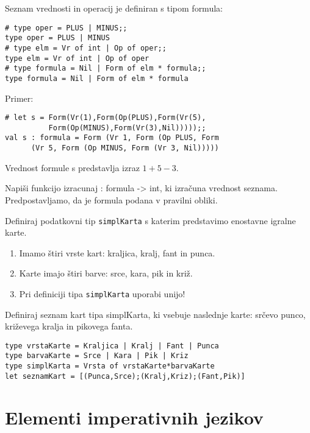 \begin{ex}
Seznam vrednosti in operacij je definiran s tipom formula: 

\begin{verbatim}
# type oper = PLUS | MINUS;; 
type oper = PLUS | MINUS 
# type elm = Vr of int | Op of oper;; 
type elm = Vr of int | Op of oper 
# type formula = Nil | Form of elm * formula;; 
type formula = Nil | Form of elm * formula 
\end{verbatim}

Primer: 
\begin{verbatim}
# let s = Form(Vr(1),Form(Op(PLUS),Form(Vr(5),
          Form(Op(MINUS),Form(Vr(3),Nil)))));;
val s : formula = Form (Vr 1, Form (Op PLUS, Form 
      (Vr 5, Form (Op MINUS, Form (Vr 3, Nil))))) 
\end{verbatim}
Vrednost formule s predstavlja izraz $1+5-3$. 

Napi\v si funkcijo izracunaj : formula -> int, ki izra\v cuna vrednost seznama. Predpostavljamo, da je formula podana v pravilni obliki.



\end{ex}
\begin{ex}
Definiraj podatkovni tip \texttt{simplKarta} s katerim predstavimo enostavne igralne karte. 
\begin{enumerate}
\item Imamo \v stiri vrste kart: kraljica, kralj, fant in punca. 
\item Karte imajo \v stiri barve: srce, kara, pik in kri\v z. 
\item Pri definiciji tipa \texttt{simplKarta} uporabi unijo!
\end{enumerate}

Definiraj seznam kart tipa simplKarta, ki vsebuje naslednje karte: sr\v cevo punco, kri\v zevega kralja in pikovega fanta. 

\begin{sol}
\begin{verbatim}
type vrstaKarte = Kraljica | Kralj | Fant | Punca
type barvaKarte = Srce | Kara | Pik | Kriz
type simplKarta = Vrsta of vrstaKarte*barvaKarte
let seznamKart = [(Punca,Srce);(Kralj,Kriz);(Fant,Pik)]
\end{verbatim}
\end{sol}


\end{ex}

\chapter{Elementi imperativnih jezikov}


